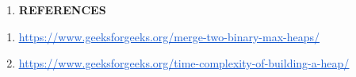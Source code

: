 \documentclass[12pt]{article}
\renewcommand{\_}{\kern-1.5pt\textunderscore\kern-1.5pt}
\begin{document}
\begin{multicols}{2}
\begin{enumerate}
\vspace{\baselineskip}
	\item \textbf{ REFERENCES}
\end{enumerate}\par

\begin{enumerate}
	\item \href{https://www.geeksforgeeks.org/merge-two-binary-max-heaps/}{\textcolor[HTML]{1155CC}{\ul{https://www.geeksforgeeks.org/merge-two-binary-max-heaps/}}}\par

	\item \href{https://www.geeksforgeeks.org/time-complexity-of-building-a-heap/}{\textcolor[HTML]{1155CC}{\ul{https://www.geeksforgeeks.org/time-complexity-of-building-a-heap/}}}
\end{enumerate}\par


\vspace{\baselineskip}

\vspace{\baselineskip}

\vspace{\baselineskip}
\tab 
\vspace{\baselineskip}
\vspace{\baselineskip}

\vspace{\baselineskip}

\vspace{\baselineskip}

\vspace{\baselineskip}

\vspace{\baselineskip}

\vspace{\baselineskip}

\vspace{\baselineskip}

\vspace{\baselineskip}

\vspace{\baselineskip}

\vspace{\baselineskip}

\vspace{\baselineskip}

\vspace{\baselineskip}

\end{multicols}

\printbibliography
\end{document}

